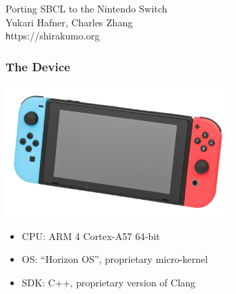 \documentclass[14pt,t,aspectratio=169]{beamer}
\begin{document}
{
  \begin{frame}
    \color{white}
    \vspace{3cm}
    {\hspace{1.4cm} \LARGE Porting SBCL to the Nintendo Switch} \\
    \vspace{1cm}
    {\hspace{1.6cm} Yukari Hafner, Charles Zhang} \\
    \vspace{0.2cm}
    {\hspace{2.1cm}\texttt https://shirakumo.org}
  \end{frame}}

\begin{frame}
  \frametitle{The Device}
  \includegraphics[height=5cm]{switch}
  \begin{itemize}
  \item CPU: ARM 4 Cortex-A57 64-bit
  \item OS: ``Horizon OS'', proprietary micro-kernel
  \item SDK: C++, proprietary version of Clang
  \end{itemize}
\end{frame}
\end{document}
